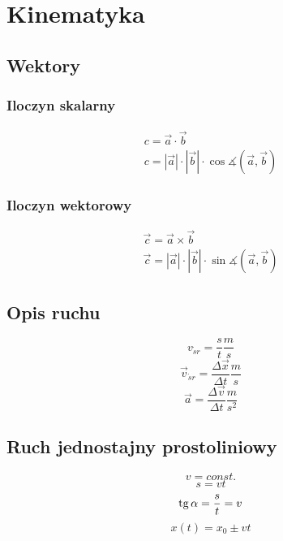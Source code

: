   \chapter{Kinematyka}
    \section{Wektory}
      \subsection{Iloczyn skalarny}
        \begin{gather}
          c = \vec a \cdot \vec b\\
          c = |\vec a|\cdot |\vec b|\cdot\cos\measuredangle(\vec a, \vec b)
        \end{gather}
      \subsection{Iloczyn wektorowy}
        \begin{gather}
          \vec c = \vec a \times \vec b\\
          \vec c = |\vec a|\cdot |\vec b|\cdot\sin\measuredangle(\vec a, \vec b)
        \end{gather}
    \section{Opis ruchu}
      \begin{equation}
        v_{\acute sr} = \frac st \unit{\frac ms}
      \end{equation}
      \begin{equation}
        \vec v_{\acute sr} = \frac{\Delta\vec x}{\Delta t} \unit{\frac ms}
      \end{equation}
      \begin{equation}
        \vec a = \frac{\Delta\vec v}{\Delta t} \unit{\frac{m}{s^2}}
      \end{equation}
    \section{Ruch jednostajny prostoliniowy}
      \begin{equation}
        v = const.
      \end{equation}
      \begin{equation}
        s = vt
      \end{equation}
      \begin{equation}
        \operatorname{tg}\alpha = \frac st = v
      \end{equation}
      \begin{equation}
        x(t) = x_0 \pm vt
      \end{equation}
